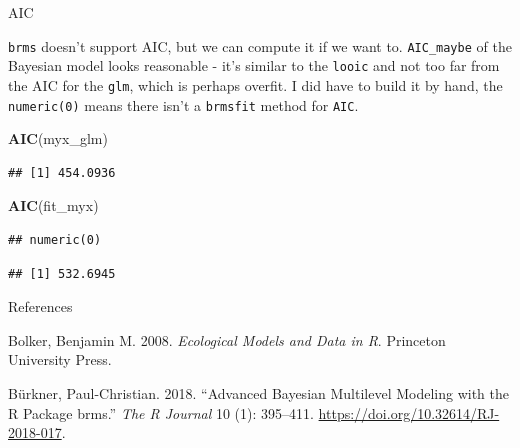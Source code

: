 \documentclass[
  ignorenonframetext,
]{beamer}
\newenvironment{Shaded}{\begin{snugshade}}{\end{snugshade}}
\newcommand{\CommentTok}[1]{\textcolor[rgb]{0.56,0.35,0.01}{\textit{#1}}}
\newcommand{\DecValTok}[1]{\textcolor[rgb]{0.00,0.00,0.81}{#1}}
\newcommand{\KeywordTok}[1]{\textcolor[rgb]{0.13,0.29,0.53}{\textbf{#1}}}
\newcommand{\NormalTok}[1]{#1}
\newcommand{\OperatorTok}[1]{\textcolor[rgb]{0.81,0.36,0.00}{\textbf{#1}}}
\newcommand{\StringTok}[1]{\textcolor[rgb]{0.31,0.60,0.02}{#1}}
\begin{document}
\begin{frame}[fragile]{AIC}
\protect\hypertarget{aic}{}

\texttt{brms} doesn't support AIC, but we can compute it if we want to.
\texttt{AIC\_maybe} of the Bayesian model looks reasonable - it's
similar to the \texttt{looic} and not too far from the AIC for the
\texttt{glm}, which is perhaps overfit. I did have to build it by hand,
the \texttt{numeric(0)} means there isn't a \texttt{brmsfit} method for
\texttt{AIC}.

\scriptsize

\begin{Shaded}
\begin{Highlighting}[]
\KeywordTok{AIC}\NormalTok{(myx_glm)}
\end{Highlighting}
\end{Shaded}

\begin{verbatim}
## [1] 454.0936
\end{verbatim}

\begin{Shaded}
\begin{Highlighting}[]
\KeywordTok{AIC}\NormalTok{(fit_myx)}
\end{Highlighting}
\end{Shaded}

\begin{verbatim}
## numeric(0)
\end{verbatim}

\begin{Shaded}
\end{Shaded}

\begin{verbatim}
## [1] 532.6945
\end{verbatim}

\end{frame}

\begin{frame}{References}
\protect\hypertarget{references}{}

\hypertarget{refs}{}
\leavevmode\hypertarget{ref-bolker}{}%
Bolker, Benjamin M. 2008. \emph{Ecological Models and Data in R}.
Princeton University Press.

\leavevmode\hypertarget{ref-brms}{}%
Bürkner, Paul-Christian. 2018. ``Advanced Bayesian Multilevel Modeling
with the R Package brms.'' \emph{The R Journal} 10 (1): 395--411.
\url{https://doi.org/10.32614/RJ-2018-017}.

\end{frame}
\end{document}
